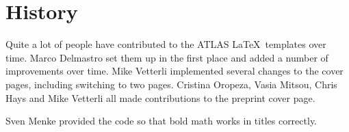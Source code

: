 \documentclass[UKenglish]{latex/atlasdoc}
\begin{document}
\section*{History}

Quite a lot of people have contributed to the ATLAS \LaTeX\ templates over time.
Marco Delmastro set them up in the first place and added a number of improvements over time.
Mike Vetterli implemented several changes to the cover pages, including switching to two pages.
Cristina Oropeza, Vasia Mitsou, Chris Hays and Mike Vetterli all made contributions to the preprint cover page.

Sven Menke provided the code so that bold math works in titles correctly.

\printbibliography
\end{document}
